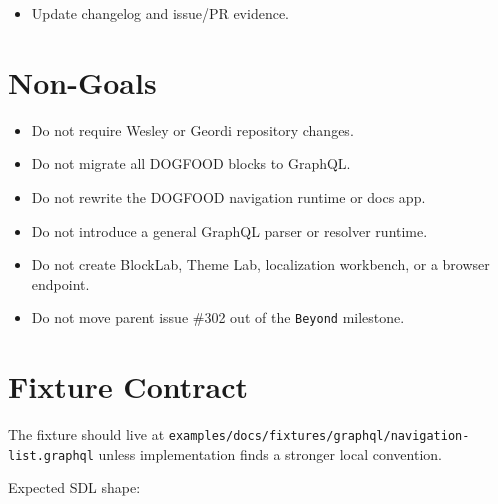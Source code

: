 \begin{itemize}
\item
  Update changelog and issue/PR evidence.
\end{itemize}

\section{Non-Goals}\label{record-142-non-goals}

\begin{itemize}
\tightlist
\item
  Do not require Wesley or Geordi repository changes.
\item
  Do not migrate all DOGFOOD blocks to GraphQL.
\item
  Do not rewrite the DOGFOOD navigation runtime or docs app.
\item
  Do not introduce a general GraphQL parser or resolver runtime.
\item
  Do not create BlockLab, Theme Lab, localization workbench, or a browser endpoint.
\item
  Do not move parent issue \#302 out of the \texttt{B\allowbreak{}e\allowbreak{}y\allowbreak{}o\allowbreak{}n\allowbreak{}d} milestone.
\end{itemize}

\section{Fixture Contract}\label{record-142-fixture-contract}

The fixture should live at \texttt{e\allowbreak{}x\allowbreak{}a\allowbreak{}m\allowbreak{}p\allowbreak{}l\allowbreak{}e\allowbreak{}s\allowbreak{}/\allowbreak{}d\allowbreak{}o\allowbreak{}c\allowbreak{}s\allowbreak{}/\allowbreak{}f\allowbreak{}i\allowbreak{}x\allowbreak{}t\allowbreak{}u\allowbreak{}r\allowbreak{}e\allowbreak{}s\allowbreak{}/\allowbreak{}g\allowbreak{}r\allowbreak{}a\allowbreak{}p\allowbreak{}h\allowbreak{}q\allowbreak{}l\allowbreak{}/\allowbreak{}n\allowbreak{}a\allowbreak{}v\allowbreak{}i\allowbreak{}g\allowbreak{}a\allowbreak{}t\allowbreak{}i\allowbreak{}o\allowbreak{}n\allowbreak{}-\allowbreak{}l\allowbreak{}i\allowbreak{}s\allowbreak{}t\allowbreak{}.\allowbreak{}g\allowbreak{}r\allowbreak{}a\allowbreak{}p\allowbreak{}h\allowbreak{}q\allowbreak{}l} unless implementation finds a stronger local convention.

Expected SDL shape:


